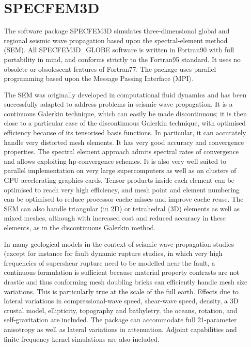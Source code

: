 \section{SPECFEM3D}
The software package SPECFEM3D simulates three-dimensional global and regional seismic wave propagation based upon the spectral-element method (SEM). All SPECFEM3D\_GLOBE software is written in Fortran90 with full portability in mind, and conforms strictly to the Fortran95 standard. It uses no obsolete or obsolescent features of Fortran77. The package uses parallel programming based upon the Message Passing Interface (MPI).

The SEM was originally developed in computational fluid dynamics and has been successfully adapted to address problems in seismic wave propagation. It is a continuous Galerkin technique, which can easily be made discontinuous; it is then close to a particular case of the discontinuous Galerkin technique, with optimised efficiency because of its tensorised basis functions. In particular, it can accurately handle very distorted mesh elements. It has very good accuracy and convergence properties. The spectral element approach admits spectral rates of convergence and allows exploiting hp-convergence schemes. It is also very well suited to parallel implementation on very large supercomputers as well as on clusters of GPU accelerating graphics cards. Tensor products inside each element can be optimised to reach very high efficiency, and mesh point and element numbering can be optimised to reduce processor cache misses and improve cache reuse. The SEM can also handle triangular (in 2D) or tetrahedral (3D) elements as well as mixed meshes, although with increased cost and reduced accuracy in these elements, as in the discontinuous Galerkin method.

In many geological models in the context of seismic wave propagation studies (except for instance for fault dynamic rupture studies, in which very high frequencies of supershear rupture need to be modelled near the fault, a continuous formulation is sufficient because material property contrasts are not drastic and thus conforming mesh doubling bricks can efficiently handle mesh size variations. This is particularly true at the scale of the full earth. Effects due to lateral variations in compressional-wave speed, shear-wave speed, density, a 3D crustal model, ellipticity, topography and bathyletry, the oceans, rotation, and self-gravitation are included. The package can accommodate full 21-parameter anisotropy as well as lateral variations in attenuation. Adjoint capabilities and finite-frequency kernel simulations are also included.

